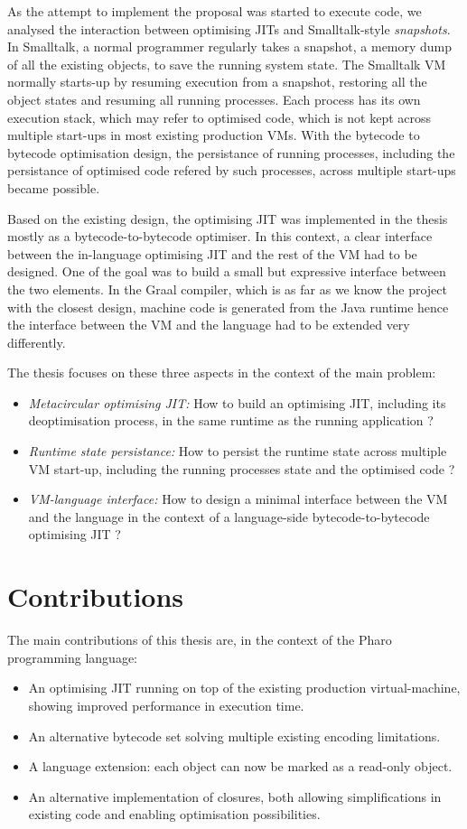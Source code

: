 \documentclass[a4paper,12pt,twoside]{../includes/ThesisStyle}
\begin{document}
As the attempt to implement the proposal was started to execute code, we analysed the interaction between optimising JITs and Smalltalk-style \emph{snapshots}. In Smalltalk, a normal programmer regularly takes a snapshot, a memory dump of all the existing objects, to save the running system state. The Smalltalk VM normally starts-up by resuming execution from a snapshot, restoring all the object states and resuming all running processes. Each process has its own execution stack, which may refer to optimised code, which is not kept across multiple start-ups in most existing production VMs. With the bytecode to bytecode optimisation design, the persistance of running processes, including the persistance of optimised code refered by such processes, across multiple start-ups became possible.

Based on the existing design, the optimising JIT was implemented in the thesis mostly as a bytecode-to-bytecode optimiser. In this context, a clear interface between the in-language optimising JIT and the rest of the VM had to be designed. One of the goal was to build a small but expressive interface between the two elements. In the Graal compiler, which is as far as we know the project with the closest design, machine code is generated from the Java runtime hence the interface between the VM and the language had to be extended very differently.

The thesis focuses on these three aspects in the context of the main problem:
\begin{itemize}
	\item \emph{Metacircular optimising JIT:} How to build an optimising JIT, including its deoptimisation process, in the same runtime as the running application ?
	\item \emph{Runtime state persistance:} How to persist the runtime state across multiple VM start-up, including the running processes state and the optimised code ?
	\item \emph{VM-language interface:} How to design a minimal interface between the VM and the language in the context of a language-side bytecode-to-bytecode optimising JIT ?
\end{itemize}

\section{Contributions}

The main contributions of this thesis are, in the context of the Pharo programming language:
\begin{itemize}
	\item An optimising JIT running on top of the existing production virtual-machine, showing improved performance in execution time.
	\item An alternative bytecode set solving multiple existing encoding limitations.
	\item A language extension: each object can now be marked as a read-only object.
	\item An alternative implementation of closures, both allowing simplifications in existing code and enabling optimisation possibilities.
\end{itemize}
\end{document}
